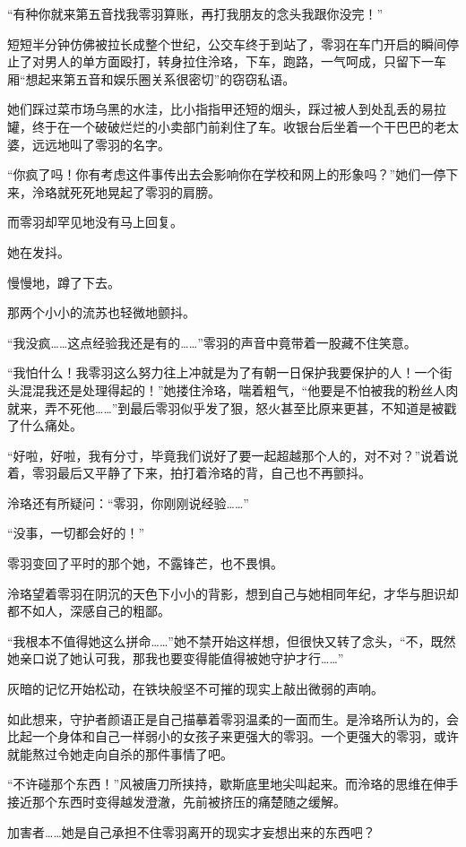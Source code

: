 \documentclass[UTF8, scheme = chinese, openany]{ctexbook}
\begin{document}
“有种你就来第五音找我零羽算账，再打我朋友的念头我跟你没完！”

短短半分钟仿佛被拉长成整个世纪，公交车终于到站了，零羽在车门开启的瞬间停止了对男人的单方面殴打，转身拉住泠珞，下车，跑路，一气呵成，只留下一车厢“想起来第五音和娱乐圈关系很密切”的窃窃私语。

她们踩过菜市场乌黑的水洼，比小指指甲还短的烟头，踩过被人到处乱丢的易拉罐，终于在一个破破烂烂的小卖部门前刹住了车。收银台后坐着一个干巴巴的老太婆，远远地叫了零羽的名字。

“你疯了吗！你有考虑这件事传出去会影响你在学校和网上的形象吗？”她们一停下来，泠珞就死死地晃起了零羽的肩膀。

而零羽却罕见地没有马上回复。

她在发抖。

慢慢地，蹲了下去。

那两个小小的流苏也轻微地颤抖。

“我没疯……这点经验我还是有的……”零羽的声音中竟带着一股藏不住笑意。

“我怕什么！我零羽这么努力往上冲就是为了有朝一日保护我要保护的人！一个街头混混我还是处理得起的！”她搂住泠珞，喘着粗气，“他要是不怕被我的粉丝人肉就来，弄不死他……”到最后零羽似乎发了狠，怒火甚至比原来更甚，不知道是被戳了什么痛处。

“好啦，好啦，我有分寸，毕竟我们说好了要一起超越那个人的，对不对？”说着说着，零羽最后又平静了下来，拍打着泠珞的背，自己也不再颤抖。

泠珞还有所疑问：“零羽，你刚刚说经验……”

“没事，一切都会好的！”

零羽变回了平时的那个她，不露锋芒，也不畏惧。

泠珞望着零羽在阴沉的天色下小小的背影，想到自己与她相同年纪，才华与胆识却都不如人，深感自己的粗鄙。

“我根本不值得她这么拼命……”她不禁开始这样想，但很快又转了念头，“不，既然她亲口说了她认可我，那我也要变得能值得被她守护才行……”

灰暗的记忆开始松动，在铁块般坚不可摧的现实上敲出微弱的声响。

如此想来，守护者颜语正是自己描摹着零羽温柔的一面而生。是泠珞所认为的，会比起一个身体和自己一样弱小的女孩子来更强大的零羽。一个更强大的零羽，或许就能熬过令她走向自杀的那件事情了吧。

“不许碰那个东西！”风被唐刀所挟持，歇斯底里地尖叫起来。而泠珞的思维在伸手接近那个东西时变得越发澄澈，先前被挤压的痛楚随之缓解。

加害者……她是自己承担不住零羽离开的现实才妄想出来的东西吧？
\end{document}
